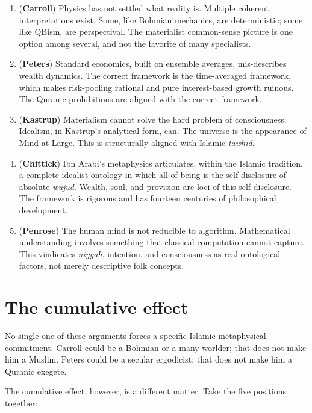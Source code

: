 \documentclass[11pt,a4paper]{book}
\theoremstyle{cleanrm}
\begin{document}
\begin{enumerate}[leftmargin=2em]
    \item (\textbf{Carroll}) Physics has not settled what reality is.
    Multiple coherent interpretations exist. Some, like Bohmian
    mechanics, are deterministic; some, like QBism, are
    perspectival. The materialist common-sense picture is one option
    among several, and not the favorite of many specialists.
    \item (\textbf{Peters}) Standard economics, built on ensemble
    averages, mis-describes wealth dynamics. The correct framework is
    the time-averaged framework, which makes risk-pooling rational
    and pure interest-based growth ruinous. The Quranic prohibitions
    are aligned with the correct framework.
    \item (\textbf{Kastrup}) Materialism cannot solve the hard problem
    of consciousness. Idealism, in Kastrup's analytical form, can. The
    universe is the appearance of Mind-at-Large. This is structurally
    aligned with Islamic \emph{tawhid}.
    \item (\textbf{Chittick}) Ibn Arabi's metaphysics articulates,
    within the Islamic tradition, a complete idealist ontology in
    which all of being is the self-disclosure of absolute \emph{wujud}.
    Wealth, soul, and provision are loci of this self-disclosure.
    The framework is rigorous and has fourteen centuries of
    philosophical development.
    \item (\textbf{Penrose}) The human mind is not reducible to
    algorithm. Mathematical understanding involves something that
    classical computation cannot capture. This vindicates
    \emph{niyyah}, intention, and consciousness as real ontological
    factors, not merely descriptive folk concepts.
\end{enumerate}

\section{The cumulative effect}

No single one of these arguments forces a specific Islamic
metaphysical commitment. Carroll could be a Bohmian or a
many-worlder; that does not make him a Muslim. Peters could be a
secular ergodicist; that does not make him a Quranic exegete.

The cumulative effect, however, is a different matter. Take the five
positions together:
\end{document}
